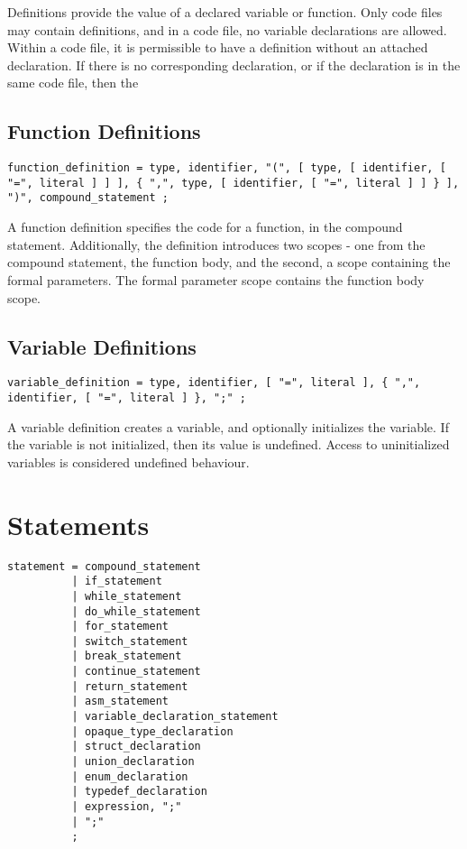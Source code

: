 \documentclass[letterpaper,12pt]{book}
\begin{document}
Definitions provide the value of a declared variable or function. Only code files may contain definitions, and in a code file, no variable declarations are allowed. Within a code file, it is permissible to have a definition without an attached declaration. If there is no corresponding declaration, or if the declaration is in the same code file, then the 

\section{Function Definitions}

\begin{lstlisting}[breaklines=true]
function_definition = type, identifier, "(", [ type, [ identifier, [ "=", literal ] ] ], { ",", type, [ identifier, [ "=", literal ] ] } ], ")", compound_statement ;
\end{lstlisting}

A function definition specifies the code for a function, in the compound statement. Additionally, the definition introduces two scopes - one from the compound statement, the function body, and the second, a scope containing the formal parameters. The formal parameter scope contains the function body scope.

\section{Variable Definitions}

\begin{lstlisting}[breaklines=true]
variable_definition = type, identifier, [ "=", literal ], { ",", identifier, [ "=", literal ] }, ";" ;
\end{lstlisting}

A variable definition creates a variable, and optionally initializes the variable. If the variable is not initialized, then its value is undefined. Access to uninitialized variables is considered undefined behaviour.

\chapter{Statements}

\begin{lstlisting}[breaklines=true]
statement = compound_statement
          | if_statement
          | while_statement
          | do_while_statement
          | for_statement
          | switch_statement
          | break_statement
          | continue_statement
          | return_statement
          | asm_statement
          | variable_declaration_statement
          | opaque_type_declaration
          | struct_declaration
          | union_declaration
          | enum_declaration
          | typedef_declaration
          | expression, ";"
          | ";"
          ;
\end{lstlisting}
\end{document}
